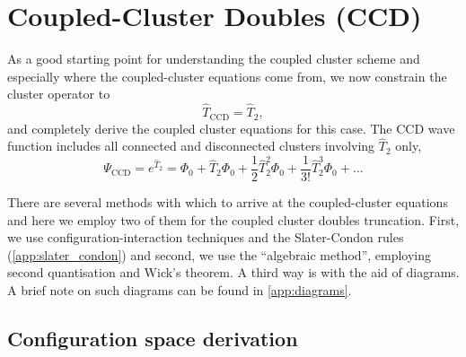 \section{Coupled-Cluster Doubles (CCD)}

As a good starting point for understanding the coupled cluster scheme and especially
where the coupled-cluster equations come from, we now constrain the cluster
operator to
\begin{equation}
    \hat{T}_{\text{CCD}} = \hat{T}_2,
\end{equation}
and completely derive the coupled cluster equations for this case.
The CCD wave function includes all connected and disconnected clusters involving
$\hat{T}_2$ only,
\begin{equation}
    \Psi_{\text{CCD}} = e^{\hat{T}_2} = \Phi_0 + \hat{T}_2\Phi_0 + \frac{1}{2}\hat{T}_2^2\Phi_0 
        + \frac{1}{3!}\hat{T}_2^3\Phi_0 + \dots
\end{equation}

There are several methods with which to arrive at the coupled-cluster equations
and here we employ two 
of them for the coupled cluster doubles truncation. First, we use
configuration-interaction techniques and the Slater-Condon rules 
(\autoref{app:slater_condon}) and second, we use the ``algebraic method'',
employing second quantisation and Wick's theorem. A third way is with the aid of
diagrams. A brief note on such diagrams can be found in \autoref{app:diagrams}.

\subsection{Configuration space derivation}

